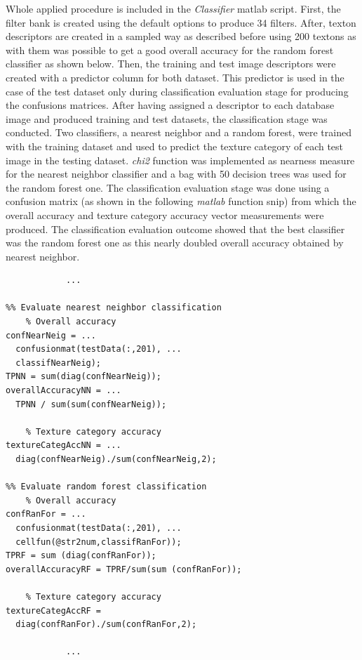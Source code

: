 \documentclass[10pt,twocolumn,letterpaper]{article}
\begin{document}
Whole applied procedure is included in the \textit{Classifier} matlab script. First, the filter bank is created using the default options to produce 34 filters. After, texton descriptors are created in a sampled way as described before using 200 textons as with them was possible to get a good overall accuracy for the random forest classifier as shown below. Then, the training and test image descriptors were created with a predictor column for both dataset. This predictor is used in the case of the test dataset only during classification evaluation stage for producing the confusions matrices. After having assigned a descriptor to each database image and produced training and test datasets,  the classification stage was conducted. Two classifiers, a nearest neighbor and a random forest, were trained with the training dataset and used to predict the texture category of each test image in the testing dataset. \textit{chi2} function was implemented as nearness measure for the nearest neighbor classifier and a bag with 50 decision trees was used for the random forest one. The classification evaluation stage was done using a confusion matrix (as shown in the following \textit{matlab} function snip) from which the overall accuracy and  texture category accuracy vector measurements were produced. The classification evaluation outcome  showed that the best classifier was the random forest one as this nearly doubled overall accuracy obtained by nearest neighbor.

\begin{verbatim}
			...
			
%% Evaluate nearest neighbor classification
    % Overall accuracy
confNearNeig = ...
  confusionmat(testData(:,201), ...
  classifNearNeig);
TPNN = sum(diag(confNearNeig));
overallAccuracyNN = ...
  TPNN / sum(sum(confNearNeig));

    % Texture category accuracy
textureCategAccNN = ...
  diag(confNearNeig)./sum(confNearNeig,2);

%% Evaluate random forest classification
    % Overall accuracy
confRanFor = ...
  confusionmat(testData(:,201), ...
  cellfun(@str2num,classifRanFor));
TPRF = sum (diag(confRanFor));
overallAccuracyRF = TPRF/sum(sum (confRanFor));

    % Texture category accuracy
textureCategAccRF = 
  diag(confRanFor)./sum(confRanFor,2);
            
            ...
\end{verbatim}
\end{document}
